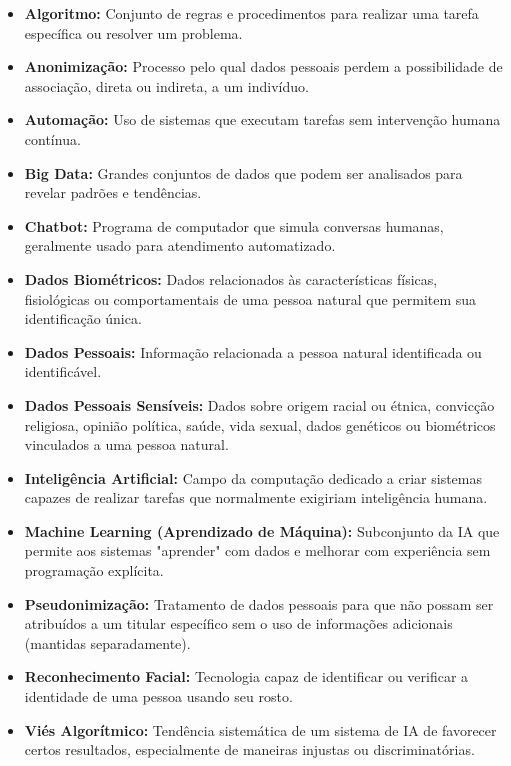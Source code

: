 \documentclass[12pt,a4paper]{article}
\begin{document}
\begin{itemize}
    \item \textbf{Algoritmo:} Conjunto de regras e procedimentos para realizar uma tarefa específica ou resolver um problema.
    
    \item \textbf{Anonimização:} Processo pelo qual dados pessoais perdem a possibilidade de associação, direta ou indireta, a um indivíduo.
    
    \item \textbf{Automação:} Uso de sistemas que executam tarefas sem intervenção humana contínua.
    
    \item \textbf{Big Data:} Grandes conjuntos de dados que podem ser analisados para revelar padrões e tendências.
    
    \item \textbf{Chatbot:} Programa de computador que simula conversas humanas, geralmente usado para atendimento automatizado.
    
    \item \textbf{Dados Biométricos:} Dados relacionados às características físicas, fisiológicas ou comportamentais de uma pessoa natural que permitem sua identificação única.
    
    \item \textbf{Dados Pessoais:} Informação relacionada a pessoa natural identificada ou identificável.
    
    \item \textbf{Dados Pessoais Sensíveis:} Dados sobre origem racial ou étnica, convicção religiosa, opinião política, saúde, vida sexual, dados genéticos ou biométricos vinculados a uma pessoa natural.
    
    \item \textbf{Inteligência Artificial:} Campo da computação dedicado a criar sistemas capazes de realizar tarefas que normalmente exigiriam inteligência humana.
    
    \item \textbf{Machine Learning (Aprendizado de Máquina):} Subconjunto da IA que permite aos sistemas "aprender" com dados e melhorar com experiência sem programação explícita.
    
    \item \textbf{Pseudonimização:} Tratamento de dados pessoais para que não possam ser atribuídos a um titular específico sem o uso de informações adicionais (mantidas separadamente).
    
    \item \textbf{Reconhecimento Facial:} Tecnologia capaz de identificar ou verificar a identidade de uma pessoa usando seu rosto.
    
    \item \textbf{Viés Algorítmico:} Tendência sistemática de um sistema de IA de favorecer certos resultados, especialmente de maneiras injustas ou discriminatórias.
\end{itemize}
\end{document}
